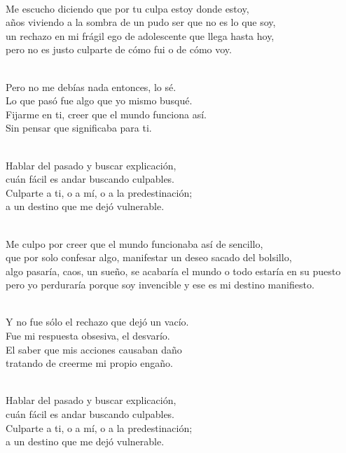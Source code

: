 \begin{lyrics}
\\
Me escucho diciendo que por tu culpa estoy donde estoy,\\
años viviendo a la sombra de un pudo ser que no es lo que soy,\\
un rechazo en mi frágil ego de adolescente que llega hasta hoy,\\
pero no es justo culparte de cómo fui o de cómo voy.

\\
Pero no me debías nada entonces, lo sé.\\
Lo que pasó fue algo que yo mismo busqué.\\
Fijarme en ti, creer que el mundo funciona así.\\
Sin pensar que significaba para ti.

\\
Hablar del pasado y buscar explicación,\\
cuán fácil es andar buscando culpables.\\
Culparte a ti, o a mí, o a la predestinación;\\
a un destino que me dejó vulnerable.

\\
Me culpo por creer que el mundo funcionaba así de sencillo,\\
que por solo confesar algo, manifestar un deseo sacado del bolsillo,\\
algo pasaría, caos, un sueño, se acabaría el mundo o todo estaría en su puesto\\
pero yo perduraría porque soy invencible y ese es mi destino manifiesto.

\\
Y no fue sólo el rechazo que dejó un vacío.\\
Fue mi respuesta obsesiva, el desvarío.\\
El saber que mis acciones causaban daño\\
tratando de creerme mi propio engaño.

\\
Hablar del pasado y buscar explicación,\\
cuán fácil es andar buscando culpables.\\
Culparte a ti, o a mí, o a la predestinación;\\
a un destino que me dejó vulnerable.


\end{lyrics}
